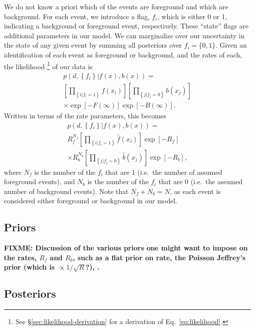 \documentclass[aps,prd,reprint]{revtex4-1}
\newcommand{\fixme}[1]{\textbf{FIXME: #1}}
\begin{document}
We do not know a priori which of the events are foreground and which
are background.  For each event, we introduce a flag, $f_i$, which is
either 0 or 1, indicating a background or foreground event,
respectively.  These ``state'' flags are additional parameters in our
model.  We can marginalize over our uncertainty in the state of any
given event by summing all posteriors over $f_i = \{0,1\}$.  Given an
identification of each event as foreground or background, and the
rates of each, the likelihood%
\footnote{See \S \ref{sec:likelihood-derivation} for a derivation of
  Eq.~\eqref{eq:likelihood}.} %
of our data is
\begin{multline}
  \label{eq:likelihood}
  p\left( d, \left\{ f_i \right\} | f(x), b(x)
  \right) = \\ \left[ \prod_{\left\{ i | f_i = 1 \right\}} f\left( x_i
    \right) \right]  \left[ \prod_{\left\{ j | f_j = 0 \right\}}
    b\left( x_j \right) \right] \\
  \times \exp\left[ - F\left( \infty \right) \right] 
  \exp\left[ -B\left( \infty \right) \right].
\end{multline}
Written in terms of the rate parameters, this becomes
\begin{multline}
  p\left( d, \left\{ f_i \right\} | f(x), b(x)\right) = \\ R_f^{N_f}
  \left[ \prod_{\left\{ i | f_i = 1 \right\}}
    \hat{f}\left( x_i \right) \right] \exp\left[ - R_f \right] \\
  \times R_b^{N_b} \left[ \prod_{\left\{ j | f_j = 0 \right\}}
    \hat{b}\left( x_j \right) \right] \exp\left[ - R_b \right],
\end{multline}
where $N_f$ is the number of the $f_i$ that are 1 (i.e.\ the number of
assumed foreground events), and $N_b$ is the number of the $f_i$ that
are 0 (i.e.\ the assumed number of background events).  Note that $N_f
+ N_b = N$, as each event is considered either foreground or
background in our model.

\subsection{Priors}

\fixme{Discussion of the various priors one might want to impose on
  the rates, $R_f$ and $R_b$, such as a flat prior on rate, the
  Poisson Jeffrey's prior (which is $\propto 1/\sqrt{R}$?), .}

\subsection{Posteriors}
\end{document}

